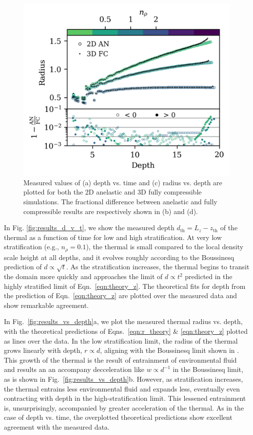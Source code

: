\documentclass[twocolumn, amsmath, amsfonts, amssymb, trackchanges]{aastex62}
\begin{document}
\begin{figure}[t!]
    \includegraphics[width=\columnwidth]{diff_AN_FC.png}
    \caption{
	Measured values of (a) depth vs. time and (c) radius vs. depth are plotted for both the 2D anelastic and 3D fully compressible simulations. 
	The fractional difference between anelastic and fully compressible results are respectively shown in (b) and (d).
    \label{fig:diff} }
\end{figure}



In Fig. \ref{fig:results_d_v_t}, we show the measured depth $d_{\text{th}} = L_z - z_{\text{th}}$ of the thermal as a function of time for low and high stratification. 
At very low stratification (e.g., $n_\rho = 0.1$), the thermal is small compared to the local density scale height at all depths, and it evolves roughly according to the Boussinesq prediction of $d \propto \sqrt{t}$. 
As the stratification increases, the thermal begins to transit the domain more quickly and approaches the limit of $d \propto t^2$ predicted in the highly stratified limit of Eqn.~\ref{eqn:theory_z}. 
The theoretical fits for depth from the prediction of Eqn.~\ref{eqn:theory_z} are plotted over the measured data and show remarkable agreement.

In Fig.~\ref{fig:results_vs_depth}a, we plot the measured thermal radius vs. depth, with the theoretical predictions of Eqns.~\ref{eqn:r_theory} \& \ref{eqn:theory_z} plotted as lines over the data. 
In the low stratification limit, the radius of the thermal grows linearly with depth, $r \propto d$, aligning with the Boussinesq limit shown in \citet{lecoanet&jeevanjee2018}.
This growth of the thermal is the result of entrainment of environmental fluid and results an an accompany decceleration like $w \propto d^{-1}$ in the Boussinesq limit, as is shown in Fig.~\ref{fig:results_vs_depth}b.
However, as stratification increases, the thermal entrains less environmental fluid and expands less, eventually even contracting with depth in the high-stratification limit. 
This lessened entrainment is, unsurprisingly, accompanied by greater acceleration of the thermal.
As in the case of depth vs. time, the overplotted theoretical predictions show excellent agreement with the measured data.
\end{document}
